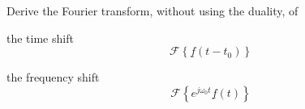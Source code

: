 \begin{question}[subtitle={Using the Fourier Transform}]
	Derive the Fourier transform, without using the duality, of
	\begin{tasks}
		\task
		the time shift
		\begin{equation*}
			\mathcal{F}\left\{\underline{f}(t - t_0)\right\}
		\end{equation*}
		
		\task
		the frequency shift
		\begin{equation*}
			\mathcal{F}\left\{e^{j \omega_0 t} \underline{f}(t)\right\}
		\end{equation*}
		
	\end{tasks}
\end{question}

